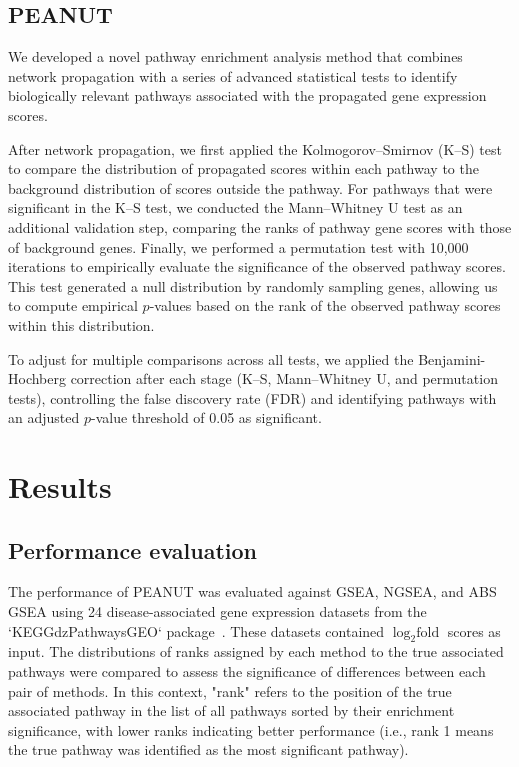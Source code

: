 \documentclass{article}
\begin{document}
\subsection{PEANUT}
We developed a novel pathway enrichment analysis method that combines network propagation with a series of advanced statistical tests to identify biologically relevant pathways associated with the propagated gene expression scores.

After network propagation, we first applied the Kolmogorov--Smirnov (K--S) test to compare the distribution of propagated scores within each pathway to the background distribution of scores outside the pathway. For pathways that were significant in the K--S test, we conducted the Mann--Whitney U test as an additional validation step, comparing the ranks of pathway gene scores with those of background genes. Finally, we performed a permutation test with 10,000 iterations to empirically evaluate the significance of the observed pathway scores. This test generated a null distribution by randomly sampling genes, allowing us to compute empirical $p$-values based on the rank of the observed pathway scores within this distribution.

To adjust for multiple comparisons across all tests, we applied the Benjamini-Hochberg correction \cite{Benjamini1995} after each stage (K--S, Mann--Whitney U, and permutation tests), controlling the false discovery rate (FDR) and identifying pathways with an adjusted $p$-value threshold of 0.05 as significant.


\section{Results}
\subsection{Performance evaluation}
The performance of PEANUT was evaluated against GSEA, NGSEA, and ABS GSEA using 24 disease-associated gene expression datasets from the `KEGGdzPathwaysGEO` package~\cite{Tarca2013}. These datasets contained $\log_{2}\text{fold}$ scores as input. The distributions of ranks assigned by each method to the true associated pathways were compared to assess the significance of differences between each pair of methods. In this context, "rank" refers to the position of the true associated pathway in the list of all pathways sorted by their enrichment significance, with lower ranks indicating better performance (i.e., rank 1 means the true pathway was identified as the most significant pathway).
\end{document}
